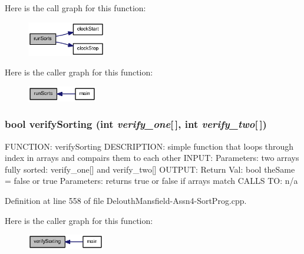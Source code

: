 Here is the call graph for this function:\nopagebreak
\begin{figure}[H]
\begin{center}
\leavevmode
\includegraphics[width=97pt]{_delouth_mansfield-_assn4-_sort_prog_8cpp_acd0f7b42076b153145b2198ffad4a0c2_cgraph}
\end{center}
\end{figure}




Here is the caller graph for this function:\nopagebreak
\begin{figure}[H]
\begin{center}
\leavevmode
\includegraphics[width=86pt]{_delouth_mansfield-_assn4-_sort_prog_8cpp_acd0f7b42076b153145b2198ffad4a0c2_icgraph}
\end{center}
\end{figure}


\hypertarget{_delouth_mansfield-_assn4-_sort_prog_8cpp_ae2cf0cca1e089e83ae98750b96b8cf11}{
\subsubsection[{verifySorting}]{\setlength{\rightskip}{0pt plus 5cm}bool verifySorting (int {\em verify\_\-one}\mbox{[}$\,$\mbox{]}, \/  int {\em verify\_\-two}\mbox{[}$\,$\mbox{]})}}
\label{_delouth_mansfield-_assn4-_sort_prog_8cpp_ae2cf0cca1e089e83ae98750b96b8cf11}
FUNCTION: verifySorting DESCRIPTION: simple function that loops through index in arrays and compairs them to each other INPUT: Parameters: two arrays fully sorted: verify\_\-one\mbox{[}\mbox{]} and verify\_\-two\mbox{[}\mbox{]} OUTPUT: Return Val: bool theSame = false or true Parameters: returns true or false if arrays match CALLS TO: n/a 

Definition at line 558 of file DelouthMansfield-\/Assn4-\/SortProg.cpp.



Here is the caller graph for this function:\nopagebreak
\begin{figure}[H]
\begin{center}
\leavevmode
\includegraphics[width=95pt]{_delouth_mansfield-_assn4-_sort_prog_8cpp_ae2cf0cca1e089e83ae98750b96b8cf11_icgraph}
\end{center}
\end{figure}




